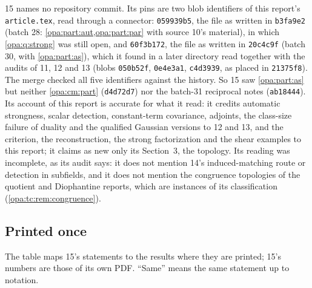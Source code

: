 \documentclass[11pt,oneside]{article}
\numberwithin{equation}{section}
\theoremstyle{definition}
\theoremstyle{remark}
\newcommand{\fn}[1]{\nolinkurl{#1}}
\begin{document}
15 names no repository commit. Its pins are two blob identifiers of this report's \fn{article.tex},
read through a connector: \texttt{059939b5}, the file as written in \texttt{b3fa9e2} (batch 28:
\cref{opa:part:aut,opa:part:par} with source 10's material), in which \cref{opa:q:strong} was still
open, and \texttt{60f3b172}, the file as written in \texttt{20c4c9f} (batch 30, with
\cref{opa:part:as}), which it found in a later directory read together with the audits of 11, 12 and 13
(blobs \texttt{050b52f}, \texttt{0e4e3a1}, \texttt{c4d3939}, as placed in \texttt{21375f8}). The merge
checked all five identifiers against the history. So 15 saw \cref{opa:part:as} but neither
\cref{opa:cm:part} (\texttt{d4d72d7}) nor the batch-31 reciprocal notes (\texttt{ab18444}). Its account
of this report is accurate for what it read: it credits automatic strongness, scalar detection,
constant-term covariance, adjoints, the class-size failure of duality and the qualified Gaussian
versions to 12 and 13, and the criterion, the reconstruction, the strong factorization and the shear
examples to this report; it claims as new only its Section~3, the topology. Its reading was
incomplete, as its audit says: it does not mention 14's induced-matching route or detection in
subfields, and it does not mention the congruence topologies of the quotient and Diophantine reports,
which are instances of its classification (\cref{opa:tc:rem:congruence}).

\subsection{Printed once}\label{opa:tc:sub:once}

The table maps 15's statements to the results where they are printed; 15's numbers are those of its
own PDF. ``Same'' means the same statement up to notation.
\end{document}
